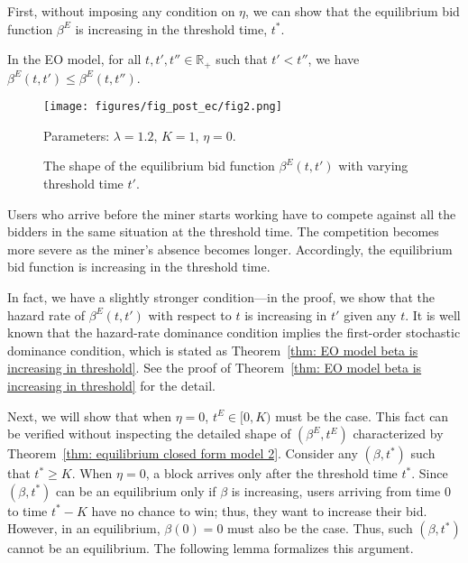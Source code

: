 \documentclass[12pt, letterpaper]{article}
\begin{document}
First, without imposing any condition on $\eta$, we can show that the equilibrium bid function $\beta^E$ is increasing in the threshold time, $t^*$.
\begin{thm}\label{thm: EO model beta is increasing in threshold}
    In the EO model, for all $t,t',t''\in \mathbb R_+$ such that 
    $t'< t''$, we have $\beta^E(t, t') \le \beta^E(t, t'')$.
\end{thm}

\begin{figure}[tbp]
    \centering
    \texttt{[image: figures/fig\_post\_ec/fig2.png]}
    \caption{The shape of the equilibrium bid function $\beta^E(t, t')$ with varying threshold time $t'$.}
    \label{fig: beta EO threshold}
    \begin{center}\footnotesize
        Parameters: $\lambda = 1.2$, $K = 1$, $\eta = 0$. 
    \end{center}
\end{figure}

Users who arrive before the miner starts working have to compete against all the bidders in the same situation at the threshold time. The competition becomes more severe as the miner's absence becomes longer. Accordingly, the equilibrium bid function is increasing in the threshold time.

In fact, we have a slightly stronger condition---in the proof, we show that the hazard rate of $\beta^E(t,t')$ with respect to $t$ is increasing in $t'$ given any $t$. It is well known that the hazard-rate dominance condition implies the first-order stochastic dominance condition, which is stated as Theorem~\ref{thm: EO model beta is increasing in threshold}. See the proof of Theorem~\ref{thm: EO model beta is increasing in threshold} for the detail.


Next, we will show that when $\eta = 0$, $t^E \in [0, K)$ must be the case. This fact can be verified without inspecting the detailed shape of $(\beta^E, t^E)$ characterized by Theorem~\ref{thm: equilibrium closed form model 2}. Consider any $(\beta, t^*)$ such that $t^* \geq K$. When $\eta=0$, a block arrives only after the threshold time $t^*$. Since $(\beta, t^*)$ can be an equilibrium only if $\beta$ is increasing, users arriving from time $0$ to time $t^* - K$ have no chance to win; thus, they want to increase their bid. However, in an equilibrium, $\beta(0) = 0$ must also be the case. Thus, such $(\beta, t^*)$ cannot be an equilibrium. The following lemma formalizes this argument.
\end{document}
